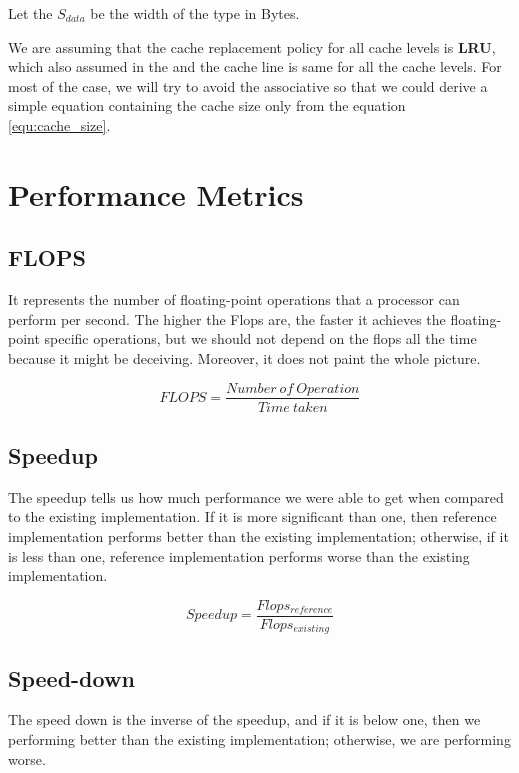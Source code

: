 Let the $S_{data}$ be the width of the type in Bytes.

We are assuming that the cache replacement policy for all cache levels is 
\textbf{LRU}, which also assumed in the \citep{BLIS} and the cache 
line is same for all the cache levels. For most of the case, 
we will try to avoid the associative so that we could derive 
a simple equation containing the cache size only from the equation \ref{equ:cache_size}.

\section{Performance Metrics}

\subsection{FLOPS}

It represents the number of floating-point operations that a processor can perform per second. 
The higher the Flops are, the faster it achieves the floating-point specific operations, 
but we should not depend on the flops all the time because it might be deceiving. 
Moreover, it does not paint the whole picture.

\begin{equation}
    FLOPS = \frac{Number\ of\ Operation}{Time\ taken}
    \label{equ:flops}
\end{equation}

\subsection{Speedup}

The speedup tells us how much performance we were able to get when compared to 
the existing implementation. If it is more significant than one, 
then reference implementation performs better than the existing implementation; 
otherwise, if it is less than one, reference implementation performs worse 
than the existing implementation.

\begin{equation}
    Speedup = \frac{Flops_{reference}}{Flops_{existing}}
    \label{equ:speedup}
\end{equation}

\subsection{Speed-down}

The speed down is the inverse of the speedup, and if it is below one, 
then we performing better than the existing implementation; 
otherwise, we are performing worse.

